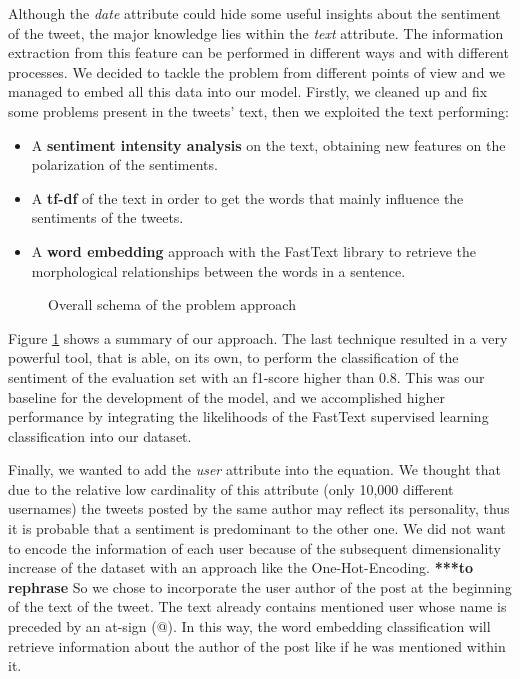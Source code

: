 \documentclass[conference]{IEEEtran}
\begin{document}
Although the \textit{date} attribute could hide some useful insights about the sentiment of the tweet, the major knowledge lies within the \textit{text} attribute. The information extraction from this feature can be performed in different ways and with different processes. We decided to tackle the problem from different points of view and we managed to embed all this data into our model. Firstly, we cleaned up and fix some problems present in the tweets' text, then we exploited the text performing:
\begin{itemize}
    \item A \textbf{sentiment intensity analysis}\cite{sentiment_analysis} on the text, obtaining new features on the polarization of the sentiments.
    \item A \textbf{tf-df}\cite{} of the text in order to get the words that mainly influence the sentiments of the tweets.
    \item A \textbf{word embedding}\cite{} approach with the FastText\cite{fasttext} library to retrieve the morphological relationships between the words in a sentence.
\end{itemize}
\begin{figure}[h]
        \centering
        
        \caption{Overall schema of the problem approach}
        \label{fig:overall_schema}
\end{figure}
Figure \ref{fig:overall_schema} shows a summary of our approach.
The last technique resulted in a very powerful tool, that is able, on its own, to perform the classification of the sentiment of the evaluation set with an f1-score\cite{f1} higher than 0.8. This was our baseline for the development of the model, and we accomplished higher performance by integrating the likelihoods of the FastText supervised learning classification into our dataset. 

Finally, we wanted to add the \textit{user} attribute into the equation. We thought that due to the relative low cardinality of this attribute (only 10,000 different usernames) the tweets posted by the same author may reflect its personality, thus it is probable that a sentiment is predominant to the other one. We did not want to encode the information of each user because of the subsequent dimensionality increase of the dataset with an approach like the One-Hot-Encoding\cite{ohe}. \textbf{***to rephrase}
So we chose to incorporate the user author of the post at the beginning of the text of the tweet. The text already contains mentioned user whose name is preceded by an at-sign (@). In this way, the word embedding classification will retrieve information about the author of the post like if he was mentioned within it.
\end{document}
